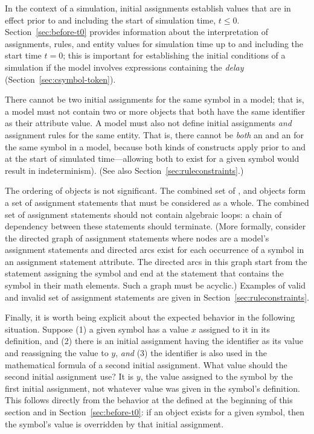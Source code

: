 In the context of a simulation, initial assignments establish
values that are in effect prior to and including the start of
simulation time, \ie $t \leq 0$.  Section~\ref{sec:before-t0}
provides information about the interpretation of assignments,
rules, and entity values for simulation time up to and including
the start time $t = 0$; this is important for establishing the
initial conditions of a simulation if the model involves
expressions containing the \emph{delay} 
(Section~\ref{sec:csymbol-token}).

There cannot be two initial assignments for the same symbol in a
model; that is, a model must not contain two or more
\InitialAssignment objects that both have the same identifier as
their  attribute value.  A model must also not define
initial assignments \emph{and} assignment rules for the same
entity.  That is, there cannot be \emph{both} an
\InitialAssignment and an \AssignmentRule for the same symbol in a
model, because both kinds of constructs apply prior to and at the
start of simulated time---allowing both to exist for a given
symbol would result in indeterminism).  (See also
Section~\ref{sec:ruleconstraints}.)

The ordering of \InitialAssignment objects is not significant.
The combined set of \InitialAssignment, \AssignmentRule and
\KineticLaw objects form a set of assignment statements that must
be considered as a whole.  The combined set of assignment
statements should not contain algebraic loops: a chain of
dependency between these statements should terminate.  (More
formally, consider the directed graph of assignment statements
where nodes are a model's assignment statements and directed arcs
exist for each occurrence of a symbol in an assignment statement
 attribute.  The directed arcs in this graph start from
the statement assigning the symbol and end at the statement that
contains the symbol in their math elements.  Such a graph must be
acyclic.) Examples of valid and invalid set of assignment
statements are given in Section~\ref{sec:ruleconstraints}.

Finally, it is worth being explicit about the expected behavior in
the following situation.  Suppose (1) a given symbol has a value
$x$ assigned to it in its definition, and (2) there is an initial
assignment having the identifier as its  value and
reassigning the value to $y$, \emph{and} (3) the identifier is
also used in the mathematical formula of a second initial
assignment.  What value should the second initial assignment use?
It is $y$, the value assigned to the symbol by the first initial
assignment, not whatever value was given in the symbol's
definition.  This follows directly from the behavior at the
defined at the beginning of this section and in
Section~\ref{sec:before-t0}: if an \InitialAssignment object
exists for a given symbol, then the symbol's value is overridden
by that initial assignment.


